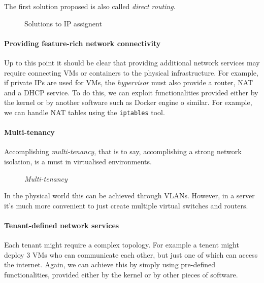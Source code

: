 \begin{note}
    The first solution proposed is also called \emph{direct routing}.
\end{note}

\newpage
\begin{figure}[ht!]
    \centering
    \hspace{2cm}
    \caption{Solutions to IP assignent}
\end{figure}

\paragraph{Providing feature-rich network connectivity}
Up to this point it should be clear that providing additional network services
may require connecting VMs or containers to the physical infrastructure. For
example, if private IPs are used for VMs, the \emph{hypervisor} must also provide
a router, NAT and a DHCP service. To do this, we can exploit functionalities
provided either by the kernel or by another software such as Docker engine o
similar. For example, we can handle NAT tables using the \texttt{iptables} tool.

\paragraph{Multi-tenancy}
Accomplishing \emph{multi-tenancy}, that is to say, accomplishing a strong network
isolation, is a must in virtualised environments.

\begin{figure}[h!]
    \centering
    \caption{\emph{Multi-tenancy}}
\end{figure}

\noindent
In the physical world this can be achieved through VLANs. However, in a server
it's much more convenient to just create multiple virtual switches and
routers.

\paragraph{Tenant-defined network services}
Each tenant might require a complex topology. For example a tenent might deploy
3 VMs who can communicate each other, but just one of which can access the
internet. Again, we can achieve this by simply using pre-defined functionalities,
provided either by the kernel or by other pieces of software.

